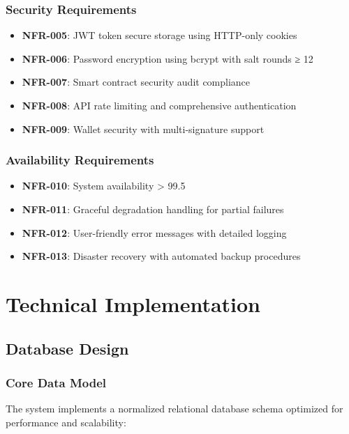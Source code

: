 \documentclass[12pt,a4paper]{article}
\begin{document}
\subsubsection{Security Requirements}
\begin{itemize}
    \item \textbf{NFR-005}: JWT token secure storage using HTTP-only cookies
    \item \textbf{NFR-006}: Password encryption using bcrypt with salt rounds ≥ 12
    \item \textbf{NFR-007}: Smart contract security audit compliance
    \item \textbf{NFR-008}: API rate limiting and comprehensive authentication
    \item \textbf{NFR-009}: Wallet security with multi-signature support
\end{itemize}

\subsubsection{Availability Requirements}
\begin{itemize}
    \item \textbf{NFR-010}: System availability > 99.5%
    \item \textbf{NFR-011}: Graceful degradation handling for partial failures
    \item \textbf{NFR-012}: User-friendly error messages with detailed logging
    \item \textbf{NFR-013}: Disaster recovery with automated backup procedures
\end{itemize}

\section{Technical Implementation}

\subsection{Database Design}

\subsubsection{Core Data Model}
The system implements a normalized relational database schema optimized for performance and scalability:
\end{document}
